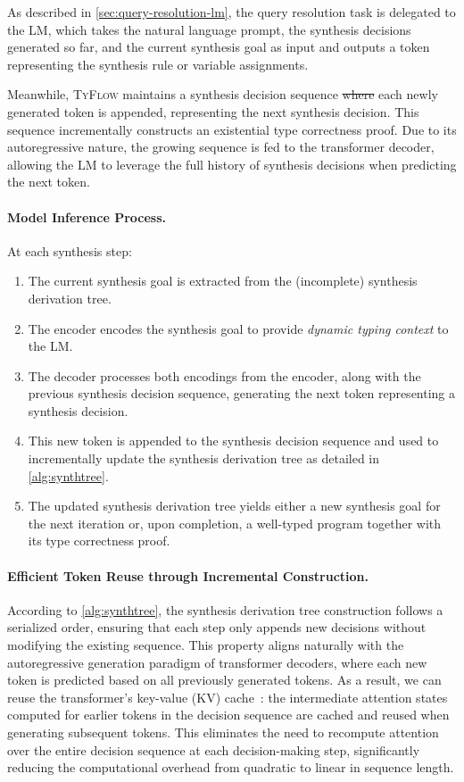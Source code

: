 \documentclass[manuscript,screen]{acmart}
\makeatletter
\newcommand{\toolname}[1]{\textsc{#1}}
\newcommand{\mainname}{\toolname{TyFlow}\xspace}
\providecommand{\DIFadd}[1]{{\protect\color{blue}\uwave{#1}}} %
\providecommand{\DIFdel}[1]{{\protect\color{red}\sout{#1}}} %
\providecommand{\DIFaddbegin}{} %
\providecommand{\DIFaddend}{} %
\providecommand{\DIFdelbegin}{} %
\providecommand{\DIFdelend}{} %
\providecommand{\DIFscaledelfig}{0.5}
\newlength{\DIFdelgraphicswidth} %
\newlength{\DIFdelgraphicsheight} %
\providecommand{\DIFaddincludegraphics}[2][]{{\color{blue}\fbox{\DIFOincludegraphics[#1]{#2}}}} %
\providecommand{\DIFdelincludegraphics}[2][]{%
\sbox{\DIFdelgraphicsbox}{\DIFOincludegraphics[#1]{#2}}%
\settoboxwidth{\DIFdelgraphicswidth}{\DIFdelgraphicsbox} %
\settoboxtotalheight{\DIFdelgraphicsheight}{\DIFdelgraphicsbox} %
\scalebox{\DIFscaledelfig}{%
\parbox[b]{\DIFdelgraphicswidth}{\usebox{\DIFdelgraphicsbox}\\[-\baselineskip] \rule{\DIFdelgraphicswidth}{0em}}\llap{\resizebox{\DIFdelgraphicswidth}{\DIFdelgraphicsheight}{%
\setlength{\unitlength}{\DIFdelgraphicswidth}%
\begin{picture}(1,1)%
\thicklines\linethickness{2pt} %
{\color[rgb]{1,0,0}\put(0,0){\framebox(1,1){}}}%
{\color[rgb]{1,0,0}\put(0,0){\line( 1,1){1}}}%
{\color[rgb]{1,0,0}\put(0,1){\line(1,-1){1}}}%
\end{picture}%
}\hspace*{3pt}}} %
} %
\DeclareRobustCommand{\DIFaddbegin}{\DIFOaddbegin \let\includegraphics\DIFaddincludegraphics} %
\DeclareRobustCommand{\DIFaddend}{\DIFOaddend \let\includegraphics\DIFOincludegraphics} %
\DeclareRobustCommand{\DIFdelbegin}{\DIFOdelbegin \let\includegraphics\DIFdelincludegraphics} %
\DeclareRobustCommand{\DIFdelend}{\DIFOaddend \let\includegraphics\DIFOincludegraphics} %
\let\sout@orig\sout %
\renewcommand{\sout}[1]{\ifmmode\text{\sout@orig{\ensuremath{#1}}}\else\sout@orig{#1}\fi} %
\makeatother
\begin{document}
As described in \autoref{sec:query-resolution-lm}, the query resolution task is delegated to the LM, which takes the natural language prompt, the synthesis decisions generated so far, and the current synthesis goal as input and outputs a token representing the synthesis rule or variable assignments.

Meanwhile, \mainname maintains a synthesis decision sequence \DIFdelbegin \DIFdel{where }\DIFdelend \DIFaddbegin \DIFadd{to which }\DIFaddend each newly generated token is appended, representing the next synthesis decision. This sequence incrementally constructs an existential type correctness proof. Due to its autoregressive nature, the growing sequence is fed to the transformer decoder, allowing the LM to leverage the full history of synthesis decisions when predicting the next token.

\paragraph{Model Inference Process.}
At each synthesis step:
\begin{enumerate}
    \item The current synthesis goal is extracted from the (incomplete) synthesis derivation tree.
    \item The encoder encodes the synthesis goal to provide \emph{dynamic typing context} to the LM.
    \item The decoder processes both encodings from the encoder, along with the previous synthesis decision sequence, generating the next token representing a synthesis decision.
    \item This new token is appended to the synthesis decision sequence and used to incrementally update the synthesis derivation tree as detailed in  \autoref{alg:synthtree}.
    \item The updated synthesis derivation tree yields either a new synthesis goal for the next iteration or, upon completion, a well-typed program together with its type correctness proof.
\end{enumerate}

\paragraph{Efficient Token Reuse through Incremental Construction.}
According to \autoref{alg:synthtree}, the synthesis derivation tree construction follows a serialized order, ensuring that each step only appends new decisions without modifying the existing sequence.
This property aligns naturally with the autoregressive generation paradigm of transformer decoders, where each new token is predicted based on all previously generated tokens.
%
As a result, we can reuse the transformer's key-value (KV) cache~\cite{DBLP:conf/mlsys/PopeDCDBHXAD23}: the intermediate attention states computed for earlier tokens in the decision sequence are cached and reused when generating subsequent tokens. This eliminates the need to recompute attention over the entire decision sequence at each decision-making step, significantly reducing the computational overhead from quadratic to linear in sequence length.
\end{document}
